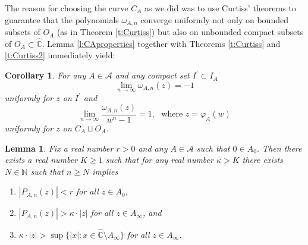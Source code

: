 \documentclass[a4paper,11pt,onecolumn]{amsart}
\newtheorem{lemma}[theorem]{Lemma}
\newtheorem{corollary}[theorem]{Corollary}
\theoremstyle{definition}
\begin{document}
The reason for choosing the curve $C_A$ as we did was to use Curtiss' theorems to guarantee that the polynomials $\omega_{A,n}$ converge uniformly not only on bounded subsets of $O_A$ (as in Theorem \ref{t:Curtiss}) but also on unbounded compact subsets of $O_A \subset \hat{\mathbb{C}}$.  Lemma \ref{l:CAproperties} together with Theorems \ref{t:Curtiss} and \ref{t:Curtiss2} immediately yield:

\begin{corollary} \label{c:omegaBehavior}
For any $A \in \mathcal{A}$ and any compact set $I^{\prime} \subset I_A$  
$$\lim_{n \rightarrow \infty} \omega_{A,n}(z) = -1$$ uniformly for $z$ on $I^{\prime}$ and
$$ \lim_{n \rightarrow \infty} \frac{\omega_{A,n}(z)}{w^n -1} = 1, \ \ \  \textrm{where } z=\varphi_A(w)$$ uniformly for $z$ on $C_A \sqcup O_A$.
\end{corollary}

\begin{lemma} \label{l:lemma1}
Fix a real number $r >0$ and any $A \in \mathcal{A}$ such that $0 \in A_0$.  Then there exists a real number $K \geq 1$ such that for any real number $\kappa > K$ there exists $N \in \mathbb{N}$ such that $n \geq N$ implies 
\begin{enumerate}
\item $|P_{A,n}(z)| < r$ for all $z \in A_0$,
\item $|P_{A,n}(z)| > \kappa \cdot |z|$ for all $z \in A_{\infty}$, and 
\item $\kappa \cdot |z| > \sup\{|x| : x \in \hat{\mathbb{C}} \setminus A_{\infty} \}$ for all $z \in A_{\infty}$.
\end{enumerate}
\end{lemma}
\end{document}
